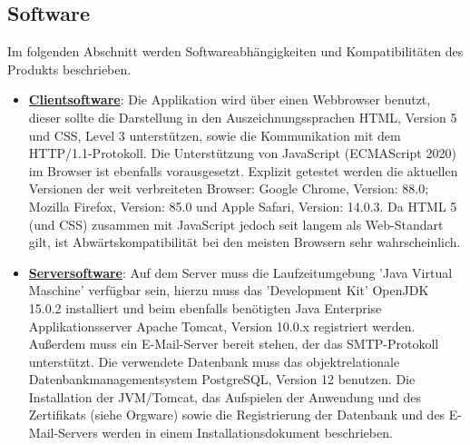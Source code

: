 \documentclass{article}
\begin{document}
\subsection{Software}
Im folgenden Abschnitt werden Softwareabhängigkeiten und Kompatibilitäten des Produkts beschrieben.
\begin{itemize}
\item \underline{\textbf{Clientsoftware}}: \linebreak
Die Applikation wird über einen Webbrowser benutzt, dieser sollte die Darstellung in den Auszeichnungssprachen HTML, Version 5 und CSS, Level 3 unterstützen, sowie die Kommunikation mit dem HTTP/1.1-Protokoll. Die Unterstützung von JavaScript (ECMAScript 2020) im Browser ist ebenfalls vorausgesetzt. Explizit getestet werden die aktuellen Versionen der weit verbreiteten Browser: Google Chrome, Version: 88.0; Mozilla Firefox, Version: 85.0 und Apple Safari, Version: 14.0.3. Da HTML 5 (und CSS) zusammen mit JavaScript jedoch seit langem als Web-Standart gilt, ist Abwärtskompatibilität bei den meisten Browsern sehr wahrscheinlich.  
\item \underline{\textbf{Serversoftware}}: \linebreak
Auf dem Server muss die Laufzeitumgebung 'Java Virtual Maschine' verfügbar sein, hierzu muss das 'Development Kit' OpenJDK 15.0.2 installiert und beim ebenfalls benötigten Java Enterprise Applikationsserver Apache Tomcat, Version 10.0.x registriert werden. Außerdem muss ein E-Mail-Server bereit stehen, der das SMTP-Protokoll unterstützt. Die verwendete Datenbank muss das objektrelationale Datenbankmanagementsystem PostgreSQL, Version 12 benutzen. Die Installation der JVM/Tomcat, das Aufspielen der Anwendung und des Zertifikats (siehe Orgware) sowie die Registrierung der Datenbank und des E-Mail-Servers werden in einem Installationsdokument beschrieben.
\end{itemize}
\end{document}
